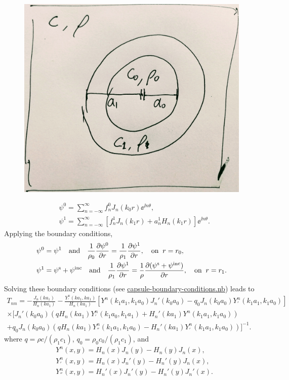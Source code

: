 \documentclass[ 12pt, a4paper]{article}
\begin{document}
\begin{figure}[t]
  \centering
  \includegraphics[width=0.4\linewidth]{capsule}
  \label{fig:capsule}
\end{figure}

\begin{align}
  & \psi^0 = \sum_{n=-\infty}^\infty f_n^0 J_{n}(k_0 r) \ee^{\ii n \theta},
  \\
  & \psi^1 = \sum_{n=-\infty}^\infty \left [ f_n^1 J_{n}(k_1 r) + a_n^1 H_{n}(k_1 r) \right ] \ee^{\ii n \theta}.
\end{align}
Applying the boundary conditions,
\begin{align}
  	& \psi^0 = \psi^1 \quad \text{and} \quad \frac{1}{\rho_0} \frac{\partial \psi^0}{\partial r} = \frac{1}{\rho_1} \frac{\partial \psi^1}{\partial r}, \quad \text{on} \;\; r = r_0,
    \label{eqn:inner_bc}
    \\
  	& \psi^1 = \psi^{\mathrm{s}} + \psi^{\mathrm{inc}} \quad \text{and} \quad \frac{1}{\rho_1} \frac{\partial \psi^1}{\partial r} = \frac{1}{\rho} \frac{\partial (\psi^{\mathrm{s}} + \psi^{\mathrm{inc}})}{\partial r}, \quad \text{on} \;\; r = r_1.
    \label{eqn:outer_bc}
\end{align}
Solving these boundary conditions (see \href{capsule-boundary-conditions.nb}{capsule-boundary-conditions.nb}) leads to
\begin{multline}
  T_{nn} = - \frac{J_n(k a_1)}{H_n(k a_1)} - \frac{Y^n_{'}(k a_1, k a_1)}{H_n(ka_1)} \left[Y^n(k_1 a_1,k_1 a_0) J_n'(k_0 a_0) - q_0 J_n(k_0 a_0) Y^n_{'}(k_1 a_1,k_1 a_0) \right]
  \\ \times \big[
    J_n'(k_0 a_0)(q H_n(k a_1)Y^n_{'}(k_1 a_0,k_1 a_1) + H_n'(k a_1) Y^n(k_1 a_1,k_1 a_0))
    \\
    + q_0 J_n(k_0 a_0)(q H_n(k a_1)Y^n_{''}(k_1 a_1,k_1 a_0) - H_n'(k a_1) Y^n_{'}(k_1 a_1, k_1 a_0))
  \big]^{-1}.
\end{multline}
where $q = \rho c/(\rho_1 c_1)$, $q_0 = \rho_0 c_0/( \rho_1 c_1)$, and
\begin{align}
  & Y^n(x,y) = H_n(x) J_n(y) - H_n(y) J_n(x), \\
  & Y^n_{'}(x,y) = H_n(x) J_n'(y) - H_n'(y) J_n(x), \\
  & Y^n_{''}(x,y) = H_n'(x) J_n'(y) - H_n'(y) J_n'(x).
\end{align}
\end{document}
